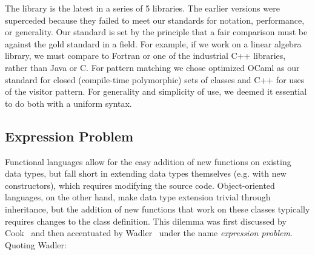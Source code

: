 The library is the latest in a series of 5 libraries. The earlier versions were 
superceded because they failed to meet our standards for notation, performance, 
or generality. Our standard is set by the principle that a fair comparison must 
be against the gold standard in a field. For example, if we work on a linear 
algebra library, we must compare to Fortran or one of the industrial C++ 
libraries, rather than Java or C. For pattern matching we chose optimized OCaml 
as our standard for closed (compile-time polymorphic) sets of classes and C++ 
for uses of the visitor pattern. For generality and simplicity of use, we deemed 
it essential to do both with a uniform syntax.

\subsection{Expression Problem}
\label{sec:exp}



Functional languages allow for the easy addition of new functions on existing data 
types, but fall short in extending data types themselves (e.g. with new constructors), 
which requires modifying the source code. Object-oriented languages, on the 
other hand, make data type extension trivial through inheritance, but the addition 
of new functions that work on these classes typically requires changes to the class 
definition. This dilemma was first discussed by Cook~\cite{Cook90} and then 
accentuated by Wadler~\cite{exprproblem} under the name \emph{expression problem}. Quoting Wadler:

